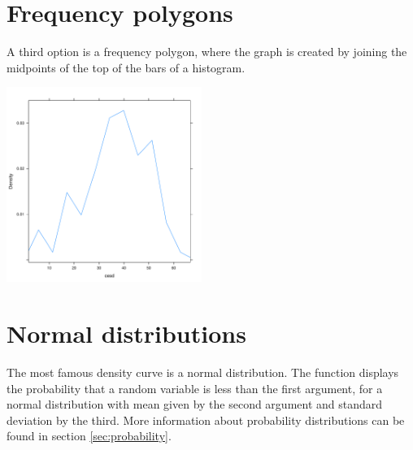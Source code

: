 \section{Frequency polygons}
%

A third option is a frequency polygon, where  the graph is created by joining the midpoints of the top of the bars of a histogram.
%
\begin{center}
\begin{knitrout}
\color{fgcolor}\begin{kframe}
\begin{alltt}
\hlstd{(}\hlopt{~}  
\end{alltt}
\end{kframe}
\includegraphics[width=2.5in]{figure/poly-1} 

\end{knitrout}
\end{center}

\section{Normal distributions}

%
The most famous density curve is a normal distribution.  The  function displays the probability that a random variable is less than the first argument, for a normal distribution with mean given by the second argument and standard deviation by the third. More information about probability distributions can be found in section \ref{sec:probability}.

